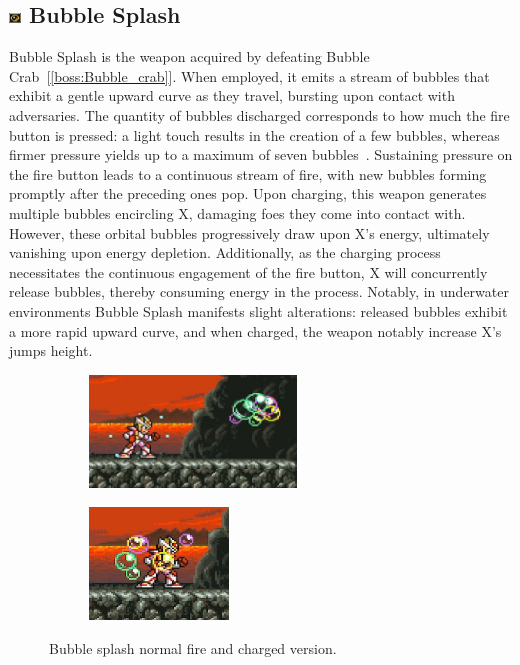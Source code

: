 \subsection{\includegraphics[width=12px, height=10px]{figures/X2/weapons/B_splash.png} Bubble Splash}\label{Bubble_splash}
Bubble Splash is the weapon acquired by defeating Bubble Crab~[\ref{boss:Bubble_crab}]. When employed, it emits a stream of bubbles that exhibit a gentle upward curve as they travel, bursting upon contact with adversaries. The quantity of bubbles discharged corresponds to how much the fire button is pressed: a light touch results in the creation of a few bubbles, whereas firmer pressure yields up to a maximum of seven bubbles~\cite{wiki:Bubble_splash}. Sustaining pressure on the fire button leads to a continuous stream of fire, with new bubbles forming promptly after the preceding ones pop. Upon charging, this weapon generates multiple bubbles encircling X, damaging foes they come into contact with. However, these orbital bubbles progressively draw upon X's energy, ultimately vanishing upon energy depletion. Additionally, as the charging process necessitates the continuous engagement of the fire button, X will concurrently release bubbles, thereby consuming energy in the process. Notably, in underwater environments Bubble Splash manifests slight alterations: released bubbles exhibit a more rapid upward curve, and when charged, the weapon notably increase X's jumps height.

\begin{figure}[htp]
	\centering
	\begin{subfigure}{0.45\linewidth}
		\centering
		\includegraphics[height=3cm]{figures/X2/weapons/B_splash_1.jpg}	
	\end{subfigure}
	\begin{subfigure}{0.4\linewidth}
		\centering
		\includegraphics[height=3cm]{figures/X2/weapons/B_splash_2.jpg}	
	\end{subfigure}
	\caption{Bubble splash normal fire and charged version.}
\end{figure}

